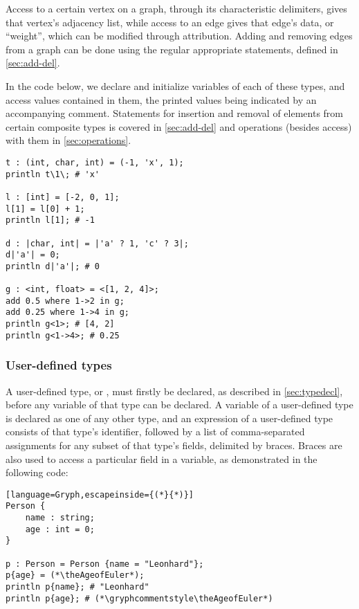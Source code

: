 Access to a certain vertex on a graph, through its characteristic delimiters, gives that vertex's adjacency list, while access to an edge gives that edge's data, or ``weight'', which can be modified through attribution. Adding and removing edges from a graph can be done using the regular appropriate statements, defined in \autoref{sec:add-del}.

In the code below, we declare and initialize variables of each of these types, and access values contained in them, the printed values being indicated by an accompanying comment. Statements for insertion and removal of elements from certain composite types is covered in \autoref{sec:add-del} and operations (besides access) with them in \autoref{sec:operations}.
\begin{lstlisting}[language=Gryph]
t : (int, char, int) = (-1, 'x', 1);
println t\1\; # 'x'

l : [int] = [-2, 0, 1];
l[1] = l[0] + 1;
println l[1]; # -1

d : |char, int| = |'a' ? 1, 'c' ? 3|;
d|'a'| = 0;
println d|'a'|; # 0

g : <int, float> = <[1, 2, 4]>;
add 0.5 where 1->2 in g;
add 0.25 where 1->4 in g;
println g<1>; # [4, 2]
println g<1->4>; # 0.25
\end{lstlisting}
\subsubsection{User-defined types}
\label{sec:usertypes}
A user-defined type, or , must firstly be declared, as described in \autoref{sec:typedecl}, before any variable of that type can be declared. A variable of a user-defined type is declared as one of any other type, and an expression of a user-defined type consists of that type's identifier, followed by a list of comma-separated assignments for any subset of that type's fields, delimited by braces. Braces are also used to access a particular field in a  variable, as demonstrated in the following code:
\setcounter{AgeofEuler}{\year-1707}
\begin{lstlisting}[language=Gryph,escapeinside={(*}{*)}]
Person {
	name : string;
	age : int = 0;
}

p : Person = Person {name = "Leonhard"};
p{age} = (*\theAgeofEuler*);
println p{name}; # "Leonhard"
println p{age}; # (*\gryphcommentstyle\theAgeofEuler*)
\end{lstlisting}